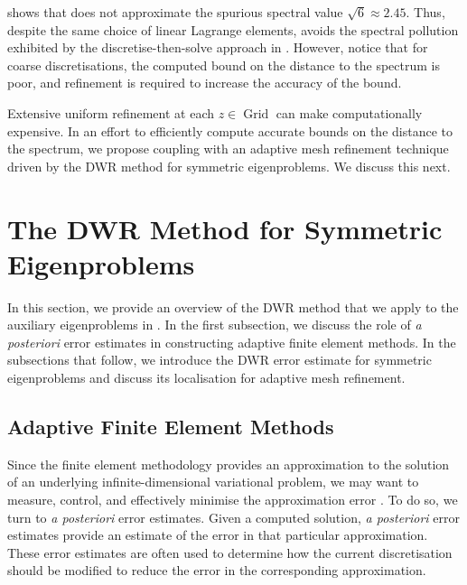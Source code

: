 % 



 shows that  does not approximate the spurious spectral value $\sqrt{6} \approx 2.45.$ Thus, despite the same choice of linear Lagrange elements, 
 avoids the spectral pollution exhibited by the discretise-then-solve approach in . However, notice that for coarse discretisations, the computed bound on the distance to the spectrum is poor, and refinement is required to increase the accuracy of the bound. 

Extensive uniform refinement at each $z \in \operatorname{Grid}$ can make  computationally expensive. In an effort to 
efficiently compute accurate bounds on the distance to the spectrum, we propose coupling  with an adaptive mesh refinement technique driven by the DWR method 
for symmetric eigenproblems. We discuss this next.


\section[The DWR Method for Symmetric Eigenproblems]{The DWR Method for Symmetric\\ Eigenproblems} \label{DWR sect}

In this section, we provide an overview of the DWR method that we apply to the auxiliary eigenproblems in . In the first subsection, we discuss the role of \textit{a posteriori} error estimates in constructing adaptive finite element methods. In the subsections that follow, we introduce the DWR error estimate for symmetric eigenproblems and discuss its localisation for adaptive mesh refinement.

\subsection{Adaptive Finite Element Methods} 

Since the finite element methodology provides an approximation to the solution of an underlying infinite-dimensional variational problem, we may want to measure, control, and effectively minimise the approximation error \cite{Oden}. To do so, we turn to \textit{a posteriori} error estimates. Given a computed solution, \textit{a posteriori} error estimates provide an estimate of the error in that particular approximation. These error estimates are often used to determine how the current discretisation should be modified to reduce the error in the corresponding approximation.

